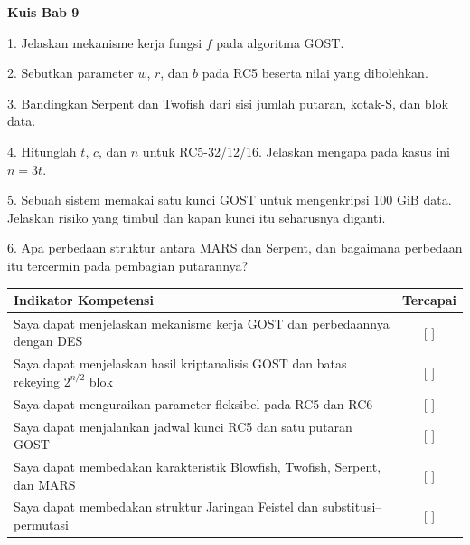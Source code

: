 
\begin{obeassessment}
\textbf{Kuis Bab 9}

1. Jelaskan mekanisme kerja fungsi $f$ pada algoritma GOST.

2. Sebutkan parameter $w$, $r$, dan $b$ pada RC5 beserta nilai yang dibolehkan.

3. Bandingkan Serpent dan Twofish dari sisi jumlah putaran, kotak-S, dan blok
   data.

4. Hitunglah $t$, $c$, dan $n$ untuk RC5-32/12/16. Jelaskan mengapa pada kasus
   ini $n = 3t$.

5. Sebuah sistem memakai satu kunci GOST untuk mengenkripsi 100 GiB data.
   Jelaskan risiko yang timbul dan kapan kunci itu seharusnya diganti.

6. Apa perbedaan struktur antara MARS dan Serpent, dan bagaimana perbedaan itu
   tercermin pada pembagian putarannya?
\end{obeassessment}
\begin{competencychecklist}
\begin{tabularx}{\linewidth}{|X|c|}
\hline
Indikator Kompetensi & Tercapai \\
\hline
Saya dapat menjelaskan mekanisme kerja GOST dan perbedaannya dengan DES & [ ] \\
\hline
Saya dapat menjelaskan hasil kriptanalisis GOST dan batas rekeying $2^{n/2}$ blok & [ ] \\
\hline
Saya dapat menguraikan parameter fleksibel pada RC5 dan RC6 & [ ] \\
\hline
Saya dapat menjalankan jadwal kunci RC5 dan satu putaran GOST & [ ] \\
\hline
Saya dapat membedakan karakteristik Blowfish, Twofish, Serpent, dan MARS & [ ] \\
\hline
Saya dapat membedakan struktur Jaringan Feistel dan substitusi--permutasi & [ ] \\
\hline
\end{tabularx}
\end{competencychecklist}
